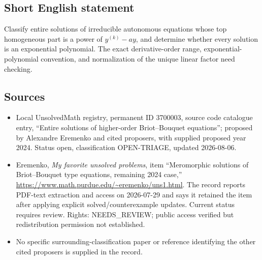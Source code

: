 \documentclass[11pt]{article}
\begin{document}
\subsection{Short English statement}
Classify entire solutions of irreducible autonomous equations whose top homogeneous part is a power of $y^{(k)}-ay$, and determine whether every solution is an exponential polynomial. The exact derivative-order range, exponential-polynomial convention, and normalization of the unique linear factor need checking.
\subsection{Sources}
\begin{itemize}
\item Local UnsolvedMath registry, permanent ID 3700003, source code catalogue entry, ``Entire solutions of higher-order Briot--Bouquet equations''; proposed by Alexandre Eremenko and cited proposers, with supplied proposed year 2024. Status open, classification OPEN-TRIAGE, updated 2026-08-06.
\item Eremenko, \emph{My favorite unsolved problems}, item ``Meromorphic solutions of Briot--Bouquet type equations, remaining 2024 case,'' \url{https://www.math.purdue.edu/~eremenko/uns1.html}. The record reports PDF-text extraction and access on 2026-07-29 and says it retained the item after applying explicit solved/counterexample updates. Current status requires review. Rights: NEEDS\_REVIEW; public access verified but redistribution permission not established.
\item No specific surrounding-classification paper or reference identifying the other cited proposers is supplied in the record.
\end{itemize}
\end{document}
